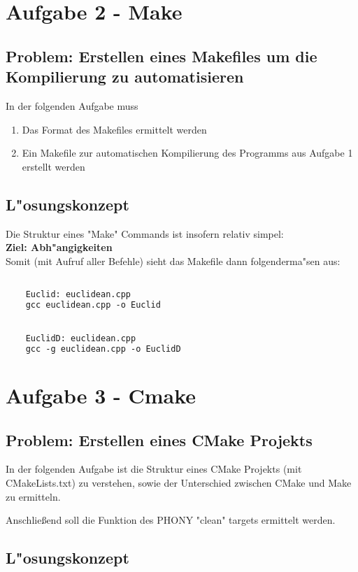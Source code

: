 \documentclass[a4paper,11pt,titlepage]{article}
\begin{document}
    \section{Aufgabe 2 - Make}

    \subsection{Problem: Erstellen eines Makefiles um die Kompilierung zu automatisieren}
    In der folgenden Aufgabe muss
    \begin{enumerate}
        \item Das Format des Makefiles ermittelt werden
        \item Ein Makefile zur automatischen Kompilierung des Programms aus Aufgabe 1 erstellt werden
    \end{enumerate}

    \subsection{L"osungskonzept}
    Die Struktur eines "Make" Commands ist insofern relativ simpel: \\
    \textbf{Ziel: Abh"angigkeiten} \\
    Somit (mit Aufruf aller Befehle) sieht das Makefile dann folgenderma"sen aus: \\
    \begin{lstlisting}[language=make, caption=Makefile]

    Euclid: euclidean.cpp
	gcc euclidean.cpp -o Euclid


    EuclidD: euclidean.cpp
	gcc -g euclidean.cpp -o EuclidD
    \end{lstlisting}


    \section{Aufgabe 3 - Cmake}

    \subsection{Problem: Erstellen eines CMake Projekts}
    In der folgenden Aufgabe ist die Struktur eines CMake Projekts (mit CMakeLists.txt) zu verstehen, sowie der Unterschied zwischen CMake und Make zu ermitteln.

    Anschließend soll die Funktion des PHONY "clean" targets ermittelt werden.

    \subsection{L"osungskonzept}
\end{document}
